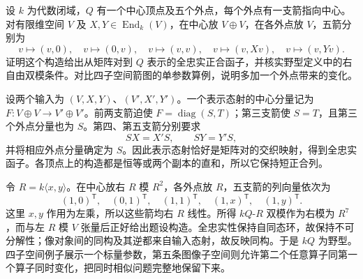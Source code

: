 \begin{optionalexercise}\label{b5:ex:10-five-subspaces-wild}
	设 \(k\) 为代数闭域，\(Q\) 有一个中心顶点及五个外点，每个外点有一支箭指向中心。对有限维空间 \(V\) 及 \(X,Y\in\operatorname{End}_k(V)\)，在中心放 \(V\oplus V\)，在各外点放 \(V\)，五箭分别为
	\[
		v\longmapsto(v,0),\quad v\longmapsto(0,v),\quad
		v\longmapsto(v,v),\quad v\longmapsto(v,Xv),\quad
		v\longmapsto(v,Yv).
	\]
	证明这个构造给出从矩阵对到 \(Q\) 表示的全忠实正合函子，并核实野型定义中的右自由双模条件。对比四子空间箭图的单参数算例，说明多加一个外点带来的变化。
\end{optionalexercise}
\begin{solution}
	设两个输入为 \((V,X,Y)\)、\((V',X',Y')\)。一个表示态射的中心分量记为 \(F:V\oplus V\to V'\oplus V'\)。前两支箭迫使 \(F=\operatorname{diag}(S,T)\)；第三支箭使 \(S=T\)，且第三个外点分量也为 \(S\)。第四、第五支箭分别要求
	\[
		SX=X'S,\qquad SY=Y'S,
	\]
	并将相应外点分量确定为 \(S\)。因此表示态射恰好是矩阵对的交织映射，得到全忠实函子。各顶点上的构造都是恒等或两个副本的直和，所以它保持短正合列。

	令 \(R=k\langle x,y\rangle\)。在中心放右 \(R\) 模 \(R^2\)，各外点放 \(R\)，五支箭的列向量依次为
	\[
		(1,0)^{\mathsf T},\quad(0,1)^{\mathsf T},\quad(1,1)^{\mathsf T},\quad(1,x)^{\mathsf T},\quad(1,y)^{\mathsf T}.
	\]
	这里 \(x,y\) 作用为左乘，所以这些箭均右 \(R\) 线性。所得 \(kQ\)-\(R\) 双模作为右模为 \(R^7\)，而与左 \(R\) 模 \(V\) 张量后正好给出题设构造。全忠实性保持自同态环，故保持不可分解性；像对象间的同构及其逆都来自输入态射，故反映同构。于是 \(kQ\) 为野型。四子空间例子展示一个标量参数，第五条图像子空间则允许第二个任意算子同第一个算子同时变化，把同时相似问题完整地保留下来。
\end{solution}
